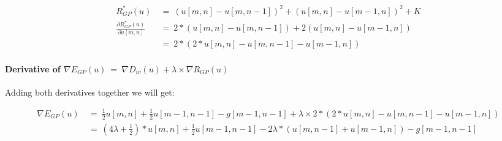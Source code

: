 \documentclass{report}
\begin{document}
\begin{enumerate}[(i)]
\begin{adjustwidth}{-8em}{}
							\vspace{-0.5cm}
							\begin{align*}
								R_{GP}^*(u) \ & = \ (u[m,n] - u[m,n-1])^2 + (u[m,n] - u[m-1,n])^2 + K \\
								\frac{\partial R_{GP}^*(u)}{\partial u[m,n]} \ & = \ 2 * (u[m,n] - u[m,n-1]) + 2 (u[m,n] - u[m-1,n]) \\
								& = \ 2 * (2 * u[m,n] - u[m,n-1] - u[m-1,n])
							\end{align*}
						\end{adjustwidth}
						\vspace{-0.6cm} \paragraph{Derivative of $\nabla E_{GP}(u) \ = \ \nabla D_{iv}(u) + \lambda \times \nabla R_{GP}(u)$}
						\startsubsection
							Adding both derivatives together we will get:
						\closesection
						\begin{adjustwidth}{-9em}{}
							\vspace{-0.6cm}
							\begin{align*}
								\nabla E_{GP}(u) \ & = \ \frac{1}{2} u[m,n]  + \frac{1}{2} u[m-1,n-1] - g[m-1,n-1] + \lambda \times 2 * (2 * u[m,n] - u[m,n-1] - u[m-1,n]) \\
								& = \ (4\lambda + \frac{1}{2}) * u[m,n] + \frac{1}{2} u[m-1,n-1] - 2\lambda*(u[m,n-1] + u[m-1,n]) - g[m-1,n-1]
							\end{align*}
						\end{adjustwidth}
					\end{enumerate}
				\closesection
			\closesection
			
\end{document}
